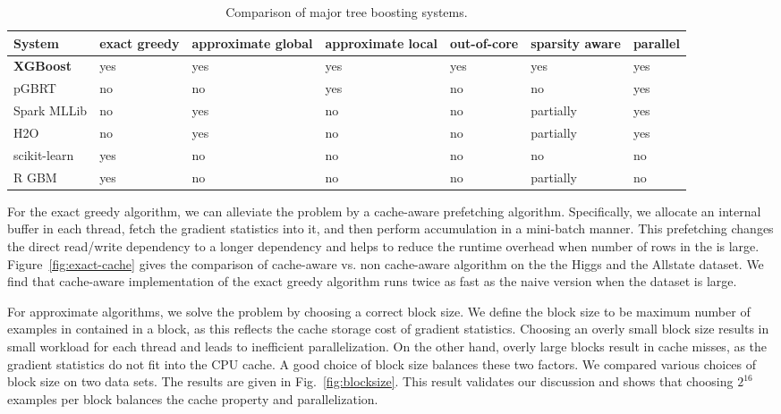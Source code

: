 \documentclass{sig-alternate-05-2015}
\begin{document}
\begin{table*}
\centering
\caption{Comparison of major tree boosting systems.}\label{tbl:system-cmp}
\begin{tabular}{|l|m{1cm}|m{1.7cm}|m{1.7cm}|m{1.7cm}|m{1.7cm}|m{1.7cm}|}\hline
  System & exact greedy & approximate global & approximate local & out-of-core &sparsity aware& parallel \\ \hline
  \textbf{XGBoost} & yes & yes  & yes &yes &yes & yes\\\hline
  pGBRT & no & no & yes & no & no & yes\\\hline
  Spark MLLib & no & yes  & no  & no & partially & yes\\\hline
  H2O & no &  yes  & no   & no & partially & yes\\\hline
  scikit-learn & yes  & no  & no & no & no & no\\ \hline
  R GBM & yes & no & no & no& partially &no\\\hline
\end{tabular}
\end{table*}

For the exact greedy algorithm, we can alleviate the problem by a cache-aware prefetching algorithm.
Specifically, we allocate an internal buffer in each thread, fetch the gradient statistics into it, and then perform accumulation in a mini-batch manner.
This prefetching changes the direct read/write dependency to a longer dependency and helps to reduce the runtime overhead when number of rows in the is large.
Figure~\ref{fig:exact-cache} gives the comparison of cache-aware vs. non cache-aware algorithm on the the Higgs and the Allstate dataset.
We find that cache-aware implementation of the exact greedy algorithm runs twice as fast as the naive version when the dataset is large.

For approximate algorithms, we solve the problem by choosing a correct block size. We define the block size to be maximum number of examples in contained in a block, as this reflects the cache storage cost of gradient statistics.
Choosing an overly small block size results in small workload for each thread and leads to inefficient parallelization. On the other hand, overly large blocks result in cache misses, as the gradient statistics do not fit into the CPU cache.
A good choice of block size balances these two factors.
We compared various choices of block size on two data sets.
The results are given in Fig.~\ref{fig:blocksize}.
This result validates our discussion and shows that choosing $2^{16}$ examples per block balances the cache property and parallelization.
\end{document}
